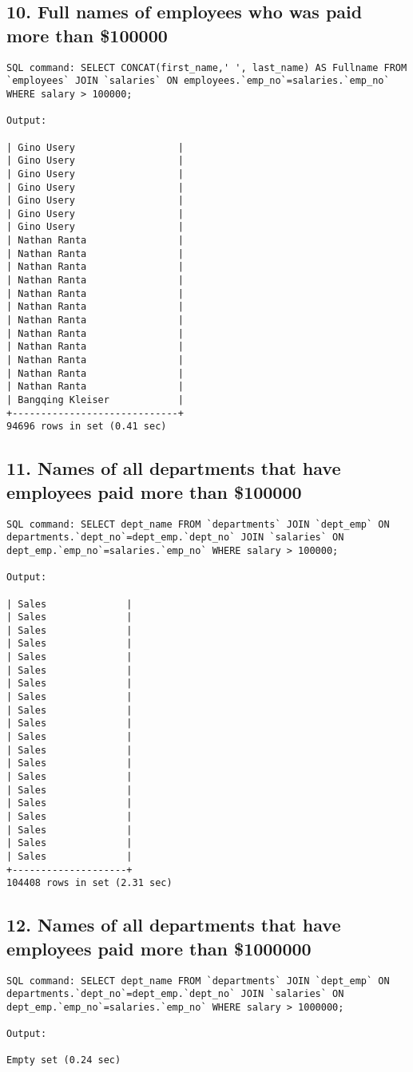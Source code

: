 \documentclass{report}
\begin{document}
\subsection*{10. Full names of employees who was paid more than \$100000}
\begin{lstlisting}
SQL command: SELECT CONCAT(first_name,' ', last_name) AS Fullname FROM `employees` JOIN `salaries` ON employees.`emp_no`=salaries.`emp_no` WHERE salary > 100000;

Output:

| Gino Usery                  |
| Gino Usery                  |
| Gino Usery                  |
| Gino Usery                  |
| Gino Usery                  |
| Gino Usery                  |
| Gino Usery                  |
| Nathan Ranta                |
| Nathan Ranta                |
| Nathan Ranta                |
| Nathan Ranta                |
| Nathan Ranta                |
| Nathan Ranta                |
| Nathan Ranta                |
| Nathan Ranta                |
| Nathan Ranta                |
| Nathan Ranta                |
| Nathan Ranta                |
| Nathan Ranta                |
| Bangqing Kleiser            |
+-----------------------------+
94696 rows in set (0.41 sec)

\end{lstlisting}

\subsection*{11. Names of all departments that have employees paid more than \$100000}
\begin{lstlisting}
SQL command: SELECT dept_name FROM `departments` JOIN `dept_emp` ON departments.`dept_no`=dept_emp.`dept_no` JOIN `salaries` ON dept_emp.`emp_no`=salaries.`emp_no` WHERE salary > 100000;

Output:

| Sales              |
| Sales              |
| Sales              |
| Sales              |
| Sales              |
| Sales              |
| Sales              |
| Sales              |
| Sales              |
| Sales              |
| Sales              |
| Sales              |
| Sales              |
| Sales              |
| Sales              |
| Sales              |
| Sales              |
| Sales              |
| Sales              |
| Sales              |
+--------------------+
104408 rows in set (2.31 sec)

\end{lstlisting}

\subsection*{12. Names of all departments that have employees paid more than \$1000000}
\begin{lstlisting}
SQL command: SELECT dept_name FROM `departments` JOIN `dept_emp` ON departments.`dept_no`=dept_emp.`dept_no` JOIN `salaries` ON dept_emp.`emp_no`=salaries.`emp_no` WHERE salary > 1000000;

Output:

Empty set (0.24 sec)

\end{lstlisting}
\end{document}
